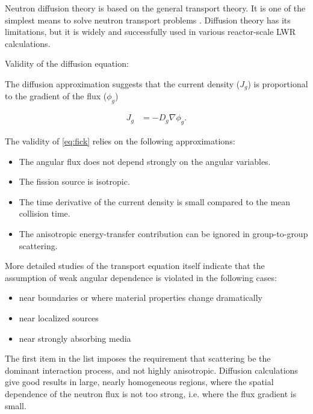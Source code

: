 \documentclass[11pt,letterpaper]{article}
\begin{document}
Neutron diffusion theory is based on the general transport theory.
It is one of the simplest means to solve neutron transport problems \cite{leppanen_development_2007}.
Diffusion theory has its limitations, but it is widely and successfully used in various reactor-scale LWR calculations.

Validity of the diffusion equation:

The diffusion approximation suggests that the current density ($J_g$) is proportional to the gradient of the flux ($\phi_g$)

\begin{align}
J_g &= -D_g \nabla \phi_g.
\label{eq:fick}
\end{align}

The validity of \ref{eq:fick} relies on the following approximations:


\begin{itemize}
	\item The angular flux does not depend strongly on the angular variables.
	\item The fission source is isotropic.
	\item The time derivative of the current density is small compared to the mean collision time.
	\item The anisotropic energy-transfer contribution can be ignored in group-to-group scattering.
\end{itemize}

More detailed studies of the transport equation itself indicate that the assumption of weak angular dependence is violated in the following cases:
\begin{itemize}
    \item near boundaries or where material properties change dramatically
    \item near localized sources
    \item near strongly absorbing media
\end{itemize}

The first item in the list imposes the requirement that scattering be the dominant interaction process, and not highly anisotropic.
Diffusion calculations give good results in large, nearly homogeneous regions, where the spatial dependence
of the neutron flux is not too strong, i.e. where the flux gradient is small.
\end{document}

